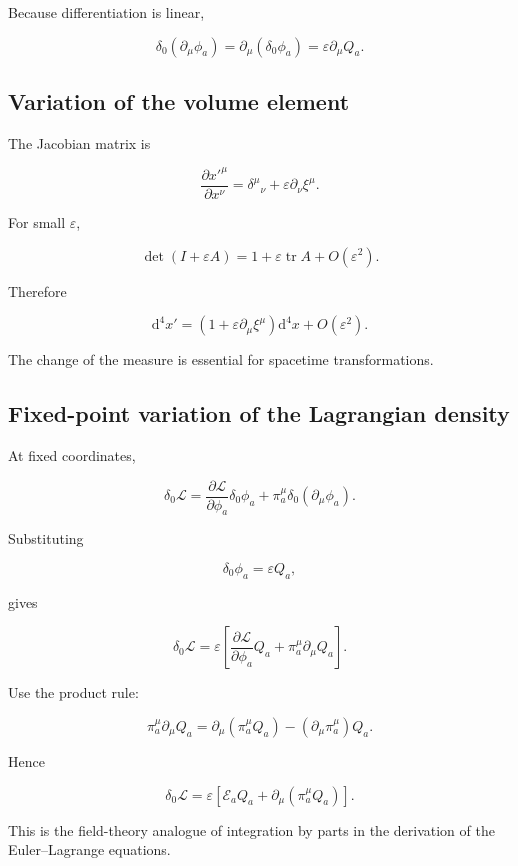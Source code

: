 Because differentiation is linear,

\[
\delta_0
\left(
\partial_{\mu}\phi_a
\right)
=
\partial_{\mu}
\left(
\delta_0\phi_a
\right)
=
\varepsilon\partial_{\mu}Q_a.
\]

\subsection{Variation of the volume element}

The Jacobian matrix is

\[
\frac{\partial x'^{\mu}}
{\partial x^{\nu}}
=
\delta^{\mu}{}_{\nu}
+
\varepsilon
\partial_{\nu}\xi^{\mu}.
\]

For small \(\varepsilon\),

\[
\det
\left(
I+\varepsilon A
\right)
=
1+\varepsilon\operatorname{tr}A
+
O(\varepsilon^{2}).
\]

Therefore

\[
\boxed{
\mathrm{d}^{4}x'
=
\left(
1+
\varepsilon\partial_{\mu}\xi^{\mu}
\right)
\mathrm{d}^{4}x
+
O(\varepsilon^{2})
}.
\]

The change of the measure is essential for spacetime transformations.

\subsection{Fixed-point variation of the Lagrangian density}

At fixed coordinates,

\[
\delta_0\mathcal{L}
=
\frac{\partial\mathcal{L}}
{\partial\phi_a}
\delta_0\phi_a
+
\pi_a^{\mu}
\delta_0
\left(
\partial_{\mu}\phi_a
\right).
\]

Substituting

\[
\delta_0\phi_a
=
\varepsilon Q_a,
\]

gives

\[
\delta_0\mathcal{L}
=
\varepsilon
\left[
\frac{\partial\mathcal{L}}
{\partial\phi_a}
Q_a
+
\pi_a^{\mu}\partial_{\mu}Q_a
\right].
\]

Use the product rule:

\[
\pi_a^{\mu}\partial_{\mu}Q_a
=
\partial_{\mu}
\left(
\pi_a^{\mu}Q_a
\right)
-
\left(
\partial_{\mu}\pi_a^{\mu}
\right)Q_a.
\]

Hence

\[
\delta_0\mathcal{L}
=
\varepsilon
\left[
\mathcal{E}_aQ_a
+
\partial_{\mu}
\left(
\pi_a^{\mu}Q_a
\right)
\right].
\]

This is the field-theory analogue of integration by parts in the derivation of the Euler--Lagrange equations.

